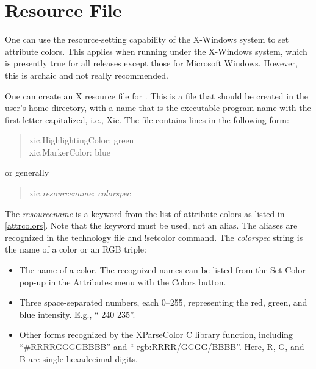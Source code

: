 \section{Resource File}
\label{resourcefile}
One can use the resource-setting capability of the X-Windows system to
set attribute colors.  This applies when running under the X-Windows
system, which is presently true for all releases except those for
Microsoft Windows.  However, this is archaic and not really recommended.

One can create an X resource file for {\Xic}.  This is a file that
should be created in the user's home directory, with a name that is
the executable program name with the first letter capitalized, i.e.,
{\vt Xic}.  The file contains lines in the following form:

\begin{quote}\vt
xic.HighlightingColor: green\\
xic.MarkerColor: blue
\end{quote}

or generally
\begin{quote}\vt
{\vt xic.}{\it resourcename}: {\it colorspec}
\end{quote}

The {\it resourcename} is a keyword from the list of attribute colors
as listed in \ref{attrcolors}.  Note that the keyword must be used,
not an alias.  The aliases are recognized in the technology file and
{\cb !setcolor} command.  The {\it colorspec} string is the name of a
color or an RGB triple:

\begin{itemize}
\item{The name of a color.  The recognized names can be listed from
   the {\cb Set Color} pop-up in the {\cb Attributes} menu with the
   {\cb Colors} button.}
\item{Three space-separated numbers, each 0--255, representing the
   red, green, and blue intensity.  E.g., ``{ 240 235}''.}
\item{Other forms recognized by the {\vt XParseColor} C library
   function, including\\ ``{\vt \#RRRRGGGGBBBB}'' and ``{\vt
   rgb:RRRR/GGGG/BBBB}''.  Here, {\vt R}, {\vt G}, and {\vt B} are
   single hexadecimal digits.}
\end{itemize}

